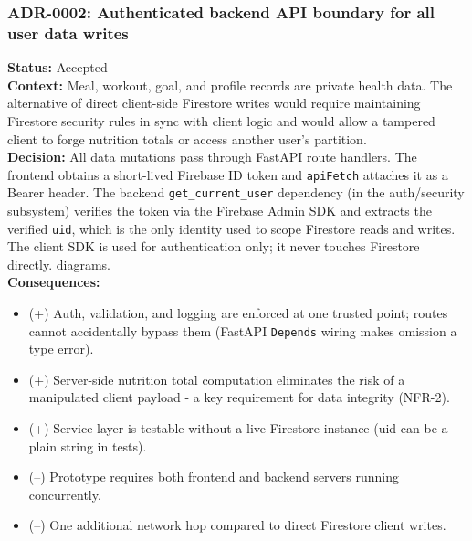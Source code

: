 \documentclass[11pt]{article}
\begin{document}
\subsubsection{ADR-0002: Authenticated backend API boundary for all user data writes}
\textbf{Status:} Accepted \\
\textbf{Context:} Meal, workout, goal, and profile records are private health data. The alternative
of direct client-side Firestore writes would require maintaining Firestore security rules in sync
with client logic and would allow a tampered client to forge nutrition totals or access another
user's partition. \\
\textbf{Decision:} All data mutations pass through FastAPI route handlers. The frontend obtains a
short-lived Firebase ID token and \texttt{apiFetch} attaches it as a Bearer header. The backend
\texttt{get\_current\_user} dependency (in the auth/security subsystem) verifies the token via the
Firebase Admin SDK and extracts the verified \texttt{uid}, which is the only identity used to
scope Firestore reads and writes. The client SDK is used for authentication only; it never touches
Firestore directly.
diagrams. \\
\textbf{Consequences:}
\begin{itemize}[leftmargin=1.2em]
  \item (+) Auth, validation, and logging are enforced at one trusted point; routes cannot
        accidentally bypass them (FastAPI \texttt{Depends} wiring makes omission a type error).
  \item (+) Server-side nutrition total computation eliminates the risk of a manipulated client
        payload - a key requirement for data integrity (NFR-2).
  \item (+) Service layer is testable without a live Firestore instance (uid can be a plain string
        in tests).
  \item (--) Prototype requires both frontend and backend servers running concurrently.
  \item (--) One additional network hop compared to direct Firestore client writes.
\end{itemize}
\end{document}
